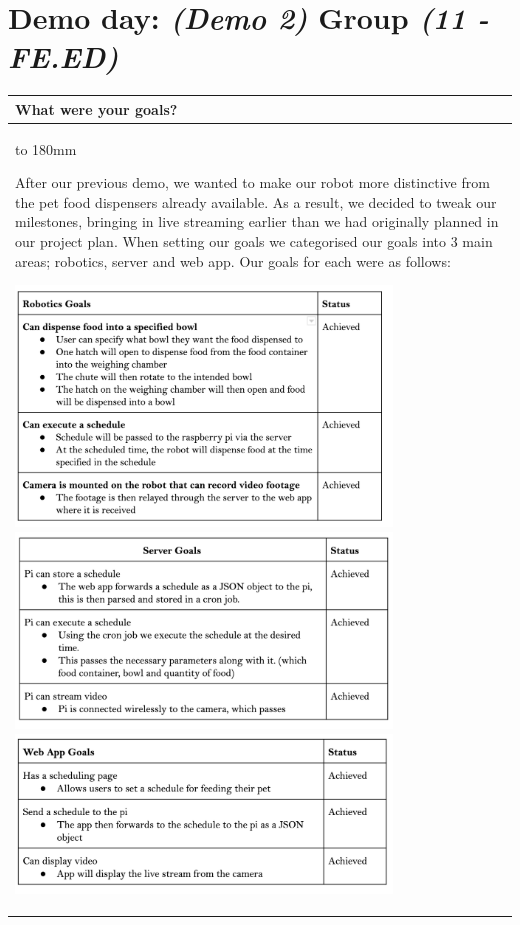 \documentclass[a4paper]{article}
\newcommand{\colWidth}{141mm}
\begin{document}
 
\section*{Demo day: \textit{(Demo 2)} Group \textit{(11 - FE.ED)}}


\begin{center}
\begin{tabular}{|p{\colWidth}|}
	\hline
	\cellcolor{blue!25}\large
	\textbf{What were your goals?}
	\\ \hline
	\vtop to 180mm{
After our previous demo, we wanted to make our robot more distinctive from the pet food dispensers already available. As a result, we decided to tweak our milestones, bringing in live streaming earlier than we had originally planned in our project plan.  
When setting our goals we categorised our goals into 3 main areas; robotics, server and web app.
Our goals for each were as follows:
 
 \includegraphics[width=10cm]{robot.png}
 \includegraphics[width=10cm]{server.png}
 \includegraphics[width=10cm]{app.png}
  }
  \\
  \hline
\end{tabular}
\vskip 5mm



\end{center}
\end{document}
